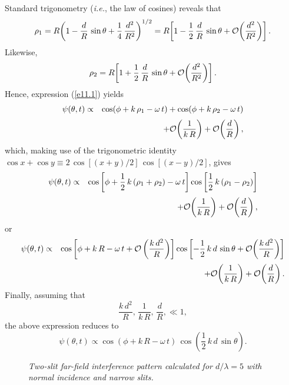 Standard trigonometry ({\em i.e.}, the law of cosines) reveals that
\begin{equation}\label{e11.3}
\rho_1 = R\!\left(1-\frac{d}{R}\,\sin\theta + \frac{1}{4}\,\frac{d^2}{R^2}\right)^{1/2}\nonumber\\[0.5ex]
=  R\!\left[1-\frac{1}{2}\,\frac{d}{R}\,\sin\theta + {\cal O}\!\left(\frac{d^2}{R^2}\right)\right].
\end{equation}
Likewise,
\begin{equation}
\rho_2 = R\!\left[1+\frac{1}{2}\,\frac{d}{R}\,\sin\theta + {\cal O}\!\left(\frac{d^2}{R^2}\right)\right].
\end{equation}
Hence, expression (\ref{e11.1}) yields
\begin{eqnarray}\label{e11.5a}
\psi(\theta,t)&\propto&\cos(\phi+k\,\rho_1-\omega\,t)+ \cos(\phi+k\,\rho_2-\omega\,t)\nonumber\\[0.5ex]&&+ {\cal O}\!\left(\frac{1}{k\,R}\right)+ {\cal O}\!\left(\frac{d}{R}\right),
\end{eqnarray}
which, making use of the trigonometric identity $\cos x + \cos y\equiv 2\,\cos[(x+y)/2]\,\cos[(x-y)/2]$, 
 gives
\begin{eqnarray}
\psi(\theta,t)&\propto&\cos\left[\phi+\frac{1}{2}\,k\,(\rho_1+\rho_2)-\omega\,t\right]\cos\left[\frac{1}{2}\,k\,(\rho_1-\rho_2)\right] \nonumber\\[0.5ex]&&+ {\cal O}\!\left(\frac{1}{k\,R}\right)+ {\cal O}\!\left(\frac{d}{R}\right),
\end{eqnarray}
or
\begin{eqnarray}
\psi(\theta,t)&\propto&\cos\left[\phi+k\,R-\omega\,t+ {\cal O}\left(\frac{k\,d^2}{R}\right)\right]
\cos\left[-\frac{1}{2}\,k\,d\,\sin\theta
+  {\cal O}\!\left(\frac{k\,d^2}{R}\right)\right]\nonumber\\[0.5ex]&&+ {\cal O}\!\left(\frac{1}{k\,R}\right)+ {\cal O}\!\left(\frac{d}{R}\right).
\end{eqnarray}
Finally, assuming that
\begin{equation}\label{e11.7}
\frac{k\,d^2}{R},\,\frac{1}{k\,R},\, \frac{d}{R},\ll 1,
\end{equation}
the above expression reduces to
\begin{equation}\label{e11.10}
\psi(\theta,t)\propto \cos(\phi+k\,R-\omega\,t)\,\cos\left(\frac{1}{2}\,k\,d\,\sin\theta\right).
\end{equation}

\begin{figure}
\epsfysize=2.5in
\centerline{}
\caption{\em Two-slit far-field interference pattern calculated for $d/\lambda = 5$ with normal incidence and narrow slits.}\label{f11.2}   
\end{figure}

